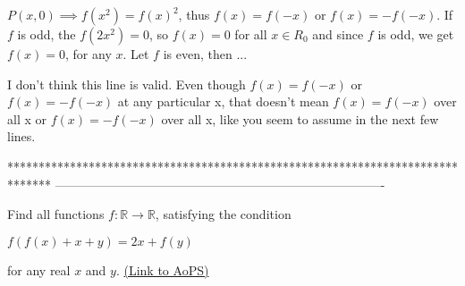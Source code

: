 \begin{solution}
	\begin{tcolorbox}
$ P(x,0) \implies f(x^2)=f(x)^2 $, thus $ f(x)=f(-x) $ or $ f(x)=-f(-x) $.
If $ f $ is odd, the $ f(2x^2)=0 $, so $ f(x)=0 $ for all $ x \in R_0 $ and since $ f $ is odd, we get $ f(x)=0 $, for any $ x $.
Let  $ f $ is even, then ... \end{tcolorbox}

I don't think this line is valid. Even though $ f(x)=f(-x) $ or $ f(x)=-f(-x) $ at any particular x, that doesn't mean $f(x)=f(-x)$ over all x or $f(x)=-f(-x)$ over all x, like you seem to assume in the next few lines.
\end{solution}
*******************************************************************************
-------------------------------------------------------------------------------

\begin{problem}
	Find all functions $f :\mathbb{R}\to\mathbb{R}$, satisfying the condition

$f(f(x)+x+y)=2x+f(y)$

for any real $x$ and $y$.
	\flushright \href{https://artofproblemsolving.com/community/c6h617711}{(Link to AoPS)}
\end{problem}



